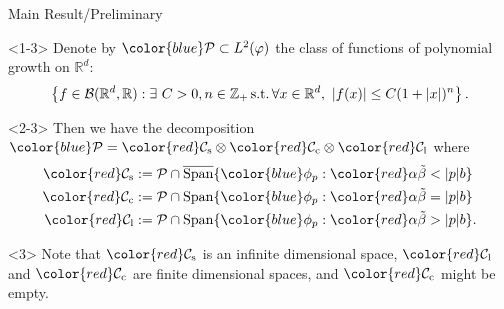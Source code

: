 \documentclass[xcolor=dvipsnames]{beamer}
\begin{document}
\begin{frame}{Main Result/Preliminary}
\begin{block}{}<1-3>
	Denote by $\color{blue}\mathcal P \subset L^2(\varphi)$ the class of {\color{PineGreen}functions of polynomial growth} on $\mathbb R^d$:
	$$
	\left\{f\in \mathcal B(\mathbb R^d, \mathbb R):\exists~ C>0, n \in \mathbb Z_+ {\rm\,  s. t. \, } \forall x\in \mathbb R^d,~ |f(x)|\leq C(1+|x|)^n\right\}.
	$$
\end{block}
\begin{block}{}<2-3>
	Then we have the decomposition ${\color{blue}\mathcal P} = {\color{red}\mathcal C_\mathrm s} \otimes {\color{red}\mathcal C_\mathrm c} \otimes {\color{red}\mathcal C_\mathrm l}$ where
\begin{align*}
	{\color{red}\mathcal C_\mathrm s} &:= \mathcal P \cap \overline{\operatorname{Span}} \{ {\color{blue}\phi_p}: {\color{red}\alpha \tilde \beta < |p| b} \}\\
 	{\color{red}\mathcal C_\mathrm c}   &:= \mathcal P \cap \operatorname{Span} \{ {\color{blue}\phi_p} : {\color{red}\alpha \tilde \beta = |p| b} \} \\
	{\color{red}\mathcal C_\mathrm l} &  := \mathcal P \cap \operatorname{Span} \{ {\color{blue}\phi_p}: {\color{red}\alpha \tilde \beta > |p| b} \}.
\end{align*}
\end{block}
\begin{block}{}<3>
Note that $\color{red}\mathcal C_\mathrm s$ is an {\color{PineGreen} infinite dimensional space}, ${\color{red}\mathcal C_\mathrm l}$ and ${\color{red}\mathcal C_\mathrm c}$
are {\color{PineGreen} finite dimensional spaces}, and ${\color{red}\mathcal C_\mathrm c}$ {\color{PineGreen} might be empty}.
\end{block}
\end{frame}
\end{document}

